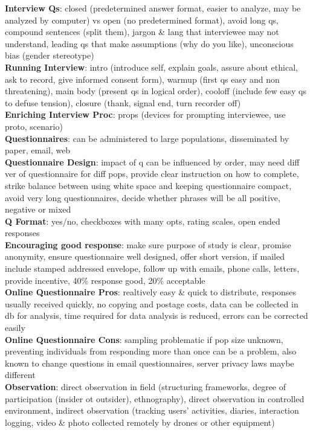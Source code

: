 \documentclass[a4paper]{article}
\begin{document}
\begin{multicols}{3}
        \textbf{Interview Qs}: closed (predetermined answer format, easier to analyze, may be analyzed by computer) vs open (no predetermined format), avoid long qs, compound sentences (split them), jargon \& lang that interviewee may not understand, leading qs that make assumptions (why do you like), unconscious bias (gender stereotype)\\
        \textbf{Running Interview}: intro (introduce self, explain goals, assure about ethical, ask to record, give informed consent form), warmup (first qs easy and non threatening), main body (present qs in logical order), cooloff (include few easy qs to defuse tension), closure (thank, signal end, turn recorder off)\\
        \textbf{Enriching Interview Proc}: props (devices for prompting interviewee, use proto, scenario)\\
        \textbf{Questionnaires}: can be administered to large populations, disseminated by paper, email, web\\
        \textbf{Questionnaire Design}: impact of q can be influenced by order, may need diff ver of questionnaire for diff pops, provide clear instruction on how to complete, strike balance between using white space and keeping questionnaire compact, avoid very long questionnaires, decide whether phrases will be all positive, negative or mixed\\
        \textbf{Q Format}: yes/no, checkboxes with many opts, rating scales, open ended responses\\
        \textbf{Encouraging good response}: make sure purpose of study is clear, promise anonymity, ensure questionnaire well designed, offer short version, if mailed include stamped addressed envelope, follow up with emails, phone calls, letters, provide incentive, 40\% response good, 20\% acceptable\\
        \textbf{Online Questionnaire Pros}: realtively easy \& quick to distribute, responses usually received quickly, no copying and postage costs, data can be collected in db for analysis, time required for data analysis is reduced, errors can be corrected easily\\
        \textbf{Online Questionnaire Cons}: sampling problematic if pop size unknown, preventing individuals from responding more than once can be a problem, also known to change questions in email questionnaires, server privacy laws maybe different\\
        \textbf{Observation}: direct observation in field (structuring frameworks, degree of participation (insider ot outsider), ethnography), direct observation in controlled environment, indirect observation (tracking users' activities, diaries, interaction logging, video \& photo collected remotely by drones or other equipment)\\

\end{multicols}
\end{document}
